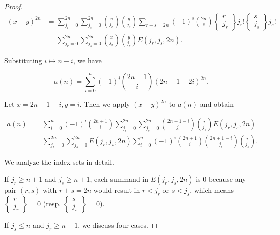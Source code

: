 \documentclass[11pt]{article}
\begin{document}
\begin{proof}
\begin{align*}
    (x - y)^{2n} &= \sum_{j_r = 0}^{2n}\sum_{j_s = 0}^{2n}\binom{x}{j_r}\binom{y}{j_s}\sum_{r + s = 2n}(-1)^s\binom{2n}{s}\begin{Bmatrix}
        r\\ j_r
    \end{Bmatrix}j_r!\begin{Bmatrix}
        s\\ j_s
    \end{Bmatrix}j_s!\\ 
    &= \sum_{j_r = 0}^{2n}\sum_{j_s = 0}^{2n}\binom{x}{j_r}\binom{y}{j_s}E(j_r, j_s, 2n).
\end{align*}

Substituting \(i\mapsto n-i\), we have 

\[
a(n) = \sum_{i = 0}^n(-1)^i\binom{2n+1}{i}(2n+1-2i)^{2n}. 
\]

Let \(x = 2n+1-i, y = i\). Then we apply \((x - y)^{2n}\) to \(a(n)\) and obtain 

\begin{align*}
    a(n) &= \sum_{i = 0}^n(-1)^i\binom{2n+1}{i}\sum_{j_r = 0}^{2n}\sum_{j_s = 0}^{2n}\binom{2n+1-i}{j_r}\binom{i}{j_s}E(j_r, j_s, 2n)\\ 
    &= \sum_{j_r = 0}^{2n}\sum_{j_s = 0}^{2n}E(j_r, j_s, 2n)\sum_{i = 0}^n(-1)^i\binom{2n+1}{i}\binom{2n+1-i}{j_r}\binom{i}{j_s}. 
\end{align*}

We analyze the index sets in detail. 

If \(j_r \geq n + 1\) and \(j_s \geq n + 1\), each summand in \(E(j_r, j_s, 2n)\) is 0 because any pair \((r, s)\) with \(r + s = 2n\) would result in \(r < j_r\) or \(s < j_s\), which means \(\begin{Bmatrix}
    r\\ j_r
\end{Bmatrix} = 0\) (resp. \(\begin{Bmatrix}
    s\\ j_s
\end{Bmatrix} = 0\)).

If \(j_s\leq n\) and \(j_r\geq n + 1\), we discuss four cases. 


\end{proof}
\end{document}
